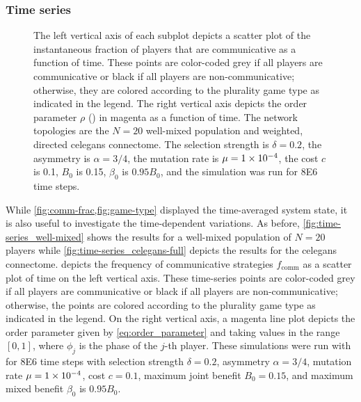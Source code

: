 \documentclass[pdflatex,lineno,referee,sn-mathphys-ay]{sn-jnl}
\begin{document}
\subsubsection{Time series}
\begin{figure}
  \centering
  
  \caption{
    The left vertical axis of each subplot depicts a scatter plot of
    the instantaneous fraction of players that are communicative
    as a function of time.
    These points are color-coded
    grey if all players are communicative or
    black if all players are non-communicative;
    otherwise, they are colored according
    to the plurality game type as indicated in the legend.
    The right vertical axis depicts the order parameter $\rho$
    () in magenta as a function of time.
    The network topologies are the
    $N=20$ well-mixed population
    and
    weighted, directed \gls{celegans} connectome.
    The selection strength is $\delta=0.2$,
    the asymmetry is $\alpha=3/4$,
    the mutation rate is $\mu=\num{1E-4}$,
    the cost $c$ is \num{0.1},
    $B_0$ is \num{0.15},
    $\beta_0$ is $\num{0.95} B_0$,
    and the simulation was run for \num{8E6} time steps.
  }
  \label{fig:time-series}
\end{figure}

While \cref{fig:comm-frac,fig:game-type} displayed
the time-averaged system state,
it is also useful to investigate the time-dependent variations.
As before, \cref{fig:time-series_well-mixed} shows the results
for a well-mixed population of $N=20$ players
while \cref{fig:time-series_celegans-full} depicts the results
for the \gls{celegans} connectome.
 depicts the frequency
of communicative strategies $f_{\text{comm}}$
as a scatter plot of time on the left vertical axis.
These time-series points are color-coded
grey if all players are communicative or
black if all players are non-communicative;
otherwise, the points are colored according
to the plurality game type as indicated in the legend.
On the right vertical axis,
a magenta line plot depicts the order parameter
given by \cref{eq:order_parameter} and
taking values in the range $[0,1]$,
where $\phi_j$ is the phase of the $j$-th player.
These simulations were run with
for \num{8E6} time steps with
selection strength $\delta = 0.2$,
asymmetry $\alpha = 3/4$,
mutation rate $\mu=\num{1E-4}$,
cost $c = \num{0.1}$,
maximum joint benefit $B_0 = 0.15$,
and maximum mixed benefit $\beta_0$ is $\num{0.95} B_0$.
\end{document}

